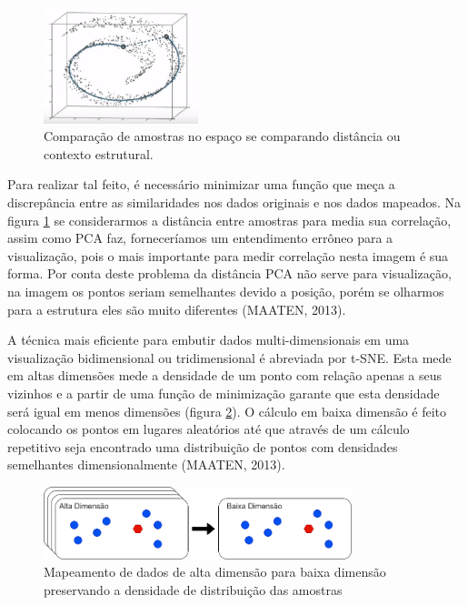 \documentclass[12pt]{report}
\begin{document}
\begin{figure}
    \centering
    \includegraphics[width=0.4\textwidth]{images/pca.png}
    \caption{Comparação de amostras no espaço se comparando distância ou contexto estrutural.}
    \label{fig:pcaxtsne}
\end{figure}

Para realizar tal feito, é necessário minimizar uma função que meça a discrepância entre as similaridades nos dados originais e nos dados mapeados. Na figura \ref{fig:pcaxtsne} se considerarmos a distância entre amostras para media sua correlação, assim como PCA faz, forneceríamos um entendimento errôneo para a visualização, pois o mais importante para medir correlação nesta imagem é sua forma. Por conta deste problema da distância PCA não serve para visualização, na imagem os pontos seriam semelhantes devido a posição, porém se olharmos para a estrutura eles são muito diferentes (MAATEN, 2013).

A técnica mais eficiente para embutir dados multi-dimensionais em uma visualização bidimensional ou tridimensional é abreviada por t-SNE. Esta mede em altas dimensões mede a densidade de um ponto com relação apenas a seus vizinhos e a partir de uma função de minimização garante que esta densidade será igual em menos dimensões (figura \ref{fig:xdto2d}). O cálculo em baixa dimensão é feito colocando os pontos em lugares aleatórios até que através de um cálculo repetitivo seja encontrado uma distribuição de pontos com densidades semelhantes dimensionalmente (MAATEN, 2013). 

\begin{figure}
    \centering
    \includegraphics[width=0.8\textwidth]{images/xdto2d.png}
    \caption{Mapeamento de dados de alta dimensão para baixa dimensão preservando a densidade de distribuição das amostras}
    \label{fig:xdto2d}
\end{figure}
\end{document}
